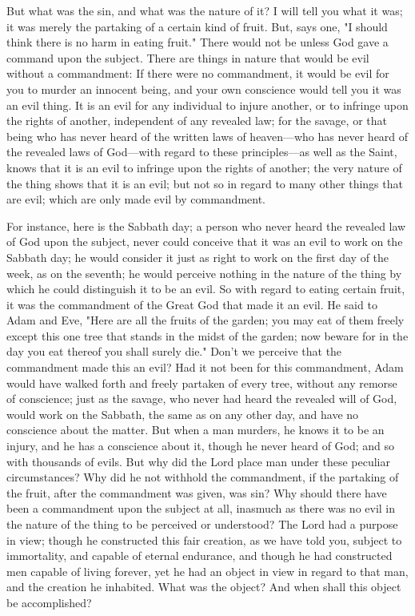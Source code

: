 But what was the sin, and what was the nature of it? I will tell you what it was; it was merely
the partaking of a certain kind of fruit. But, says one, "I should think there is no harm in
eating fruit." There would not be unless God gave a command upon the subject. There are
things in nature that would be evil without a commandment: If there were no commandment,
it would be evil for you to murder an innocent being, and your own conscience would tell
you it was an evil thing. It is an evil for any individual to injure another, or to infringe upon
the rights of another, independent of any revealed law; for the savage, or that being who has
never heard of the written laws of heaven—who has never heard of the revealed laws of
God—with regard to these principles—as well as the Saint, knows that it is an evil to infringe
upon the rights of another; the very nature of the thing shows that it is an evil; but not so in
regard to many other things that are evil; which are only made evil by commandment.

For instance, here is the Sabbath day; a person who never heard the revealed law of God
upon the subject, never could conceive that it was an evil to work on the Sabbath day; he
would consider it just as right to work on the first day of the week, as on the seventh; he
would perceive nothing in the nature of the thing by which he could distinguish it to be an
evil. So with regard to eating certain fruit, it was the commandment of the Great God that
made it an evil. He said to Adam and Eve, "Here are all the fruits of the garden; you may eat
of them freely except this one tree that stands in the midst of the garden; now beware for in
the day you eat thereof you shall surely die." Don't we perceive that the commandment made
this an evil? Had it not been for this commandment, Adam would have walked forth and
freely partaken of every tree, without any remorse of conscience; just as the savage, who
never had heard the revealed will of God, would work on the Sabbath, the same as on any
other day, and have no conscience about the matter. But when a man murders, he knows it to
be an injury, and he has a conscience about it, though he never heard of God; and so with
thousands of evils. But why did the Lord place man under these peculiar circumstances?
Why did he not withhold the commandment, if the partaking of the fruit, after the
commandment was given, was sin? Why should there have been a commandment upon the
subject at all, inasmuch as there was no evil in the nature of the thing to be perceived or
understood? The Lord had a purpose in view; though he constructed this fair creation, as we
have told you, subject to immortality, and capable of eternal endurance, and though he had
constructed men capable of living forever, yet he had an object in view in regard to that man,
and the creation he inhabited. What was the object? And when shall this object be
accomplished?

